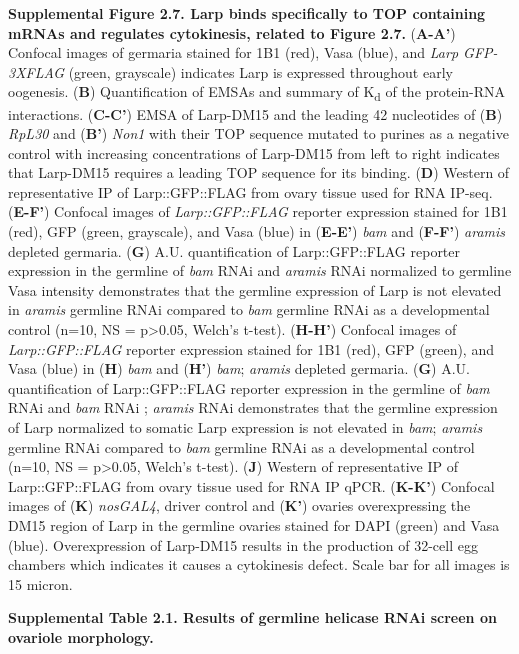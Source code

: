 \documentclass[12pt,twoside]{reedthesis}
\begin{document}
\textbf{Supplemental Figure 2.7. Larp binds specifically to TOP containing mRNAs
and regulates cytokinesis, related to Figure 2.7.} (\textbf{A-A'}) Confocal
images of germaria stained for 1B1 (red), Vasa (blue), and \emph{Larp
GFP-3XFLAG} (green, grayscale) indicates Larp is expressed throughout
early oogenesis. (\textbf{B}) Quantification of EMSAs and summary of K\textsubscript{d} of
the protein-RNA interactions. (\textbf{C-C'}) EMSA of Larp-DM15 and the
leading 42 nucleotides of (\textbf{B}) \emph{RpL30} and (\textbf{B'}) \emph{Non1} with their
TOP sequence mutated to purines as a negative control with increasing
concentrations of Larp-DM15 from left to right indicates that Larp-DM15
requires a leading TOP sequence for its binding. (\textbf{D}) Western of
representative IP of Larp::GFP::FLAG from ovary tissue used for RNA
IP-seq. (\textbf{E-F'}) Confocal images of \emph{Larp::GFP::FLAG} reporter
expression stained for 1B1 (red), GFP (green, grayscale), and Vasa
(blue) in (\textbf{E-E'}) \emph{bam} and (\textbf{F-F'}) \emph{aramis} depleted germaria.
(\textbf{G}) A.U. quantification of Larp::GFP::FLAG reporter expression in
the germline of \emph{bam} RNAi and \emph{aramis} RNAi normalized to germline Vasa
intensity demonstrates that the germline expression of Larp is not
elevated in \emph{aramis} germline RNAi compared to \emph{bam} germline RNAi as a
developmental control (n=10, NS = p\textgreater0.05, Welch's t-test). (\textbf{H-H'})
Confocal images of \emph{Larp::GFP::FLAG} reporter expression stained for 1B1
(red), GFP (green), and Vasa (blue) in (\textbf{H}) \emph{bam} and (\textbf{H'}) \emph{bam};
\emph{aramis} depleted germaria. (\textbf{G}) A.U. quantification of
Larp::GFP::FLAG reporter expression in the germline of \emph{bam} RNAi and
\emph{bam} RNAi ; \emph{aramis} RNAi demonstrates that the germline expression of
Larp normalized to somatic Larp expression is not elevated in \emph{bam};
\emph{aramis} germline RNAi compared to \emph{bam} germline RNAi as a
developmental control (n=10, NS = p\textgreater0.05, Welch's t-test). (\textbf{J})
Western of representative IP of Larp::GFP::FLAG from ovary tissue used
for RNA IP qPCR. (\textbf{K-K'}) Confocal images of (\textbf{K}) \emph{nosGAL4}, driver
control and (\textbf{K'}) ovaries overexpressing the DM15 region of Larp in
the germline ovaries stained for DAPI (green) and Vasa (blue).
Overexpression of Larp-DM15 results in the production of 32-cell egg
chambers which indicates it causes a cytokinesis defect. Scale bar for
all images is 15 micron.

\textbf{Supplemental Table 2.1. Results of germline helicase RNAi screen on
ovariole morphology.}
\end{document}
